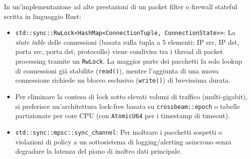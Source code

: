 \documentclass[11pt,a4paper]{article}
\begin{document}
\begin{altbox}
In un'implementazione ad alte prestazioni di un packet filter o firewall stateful scritta in linguaggio Rust:
\begin{itemize}
    \item \texttt{std::sync::RwLock<HashMap<ConnectionTuple, ConnectionState>>}: La \textit{state table} delle connessioni (basata sulla tupla a 5 elementi: IP src, IP dst, porta src, porta dst, protocollo) viene condivisa tra i thread di packet processing tramite un \texttt{RwLock}. La maggior parte dei pacchetti fa solo lookup di connessioni gi\`a stabilite (\texttt{read()}), mentre l'aggiunta di una nuova connessione richiede un blocco esclusivo (\texttt{write()}) di brevissima durata.
    \item Per eliminare la contesa di lock sotto elevati volumi di traffico (multi-gigabit), si preferisce un'architettura lock-free basata su \texttt{crossbeam::epoch} o tabelle partizionate per core CPU (con \texttt{AtomicU64} per i timestamp di timeout).
    \item \texttt{std::sync::mpsc::sync\_channel}: Per inoltrare i pacchetti sospetti o violazioni di policy a un sottosistema di logging/alerting asincrono senza degradare la latenza del piano di inoltro dati principale.
\end{itemize}
\end{altbox}
\end{document}
